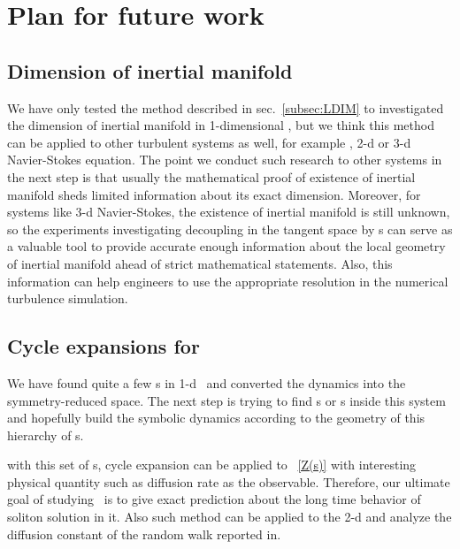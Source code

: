 
\section{Plan for future work}
\label{sec:future}

\subsection{Dimension of inertial manifold}
We have only tested the method described in sec.~\ref{subsec:LDIM}
to investigated the dimension of inertial manifold in
1-dimensional \KSe, but we think this method can be applied to
other turbulent systems as well, for example \cGLe, 2-d or 3-d
Navier-Stokes equation. The point we conduct such research to other
systems in the next step
 is that
usually the mathematical proof of existence of inertial manifold
sheds
limited information about its exact dimension. Moreover,
for systems like
3-d Navier-Stokes, the existence of inertial manifold is still
unknown, so the experiments investigating decoupling in the
tangent space by \Fv s can serve as a valuable tool to provide
accurate enough information about the local geometry of inertial
manifold ahead of strict mathematical statements.
Also, this information can help engineers to use the appropriate
resolution in the numerical turbulence simulation.

\subsection{Cycle expansions for \cqcGLe}
We have found quite a few \reqv s in 1-d \cqcGLe\ and converted
the dynamics into the symmetry-reduced space. The next step
is trying to find \po s or \rpo s inside this system and
hopefully build the symbolic dynamics according to the
geometry of this hierarchy of \po s.

with this set of \po s, cycle expansion can be applied to \Fd\
\eqref{Z(s)} with interesting physical quantity such as diffusion rate as
the observable. Therefore, our ultimate goal of studying \cqcGLe\ is to
give exact prediction about the long time behavior of soliton solution in
it. Also such method can be applied to the 2-d \cqcGL and analyze the
diffusion constant of the random walk reported in\rf{CaCiDeBr12}.
